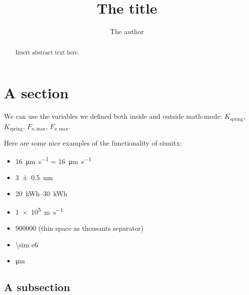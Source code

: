 \documentclass[11pt,a4paper]{article}
\title{The title}
\author{The author}
\newcommand{\Kspring}{\ensuremath{K_\mathrm{spring}}\xspace}
\newcommand{\Fxmax}{\ensuremath{F_{x,\mathrm{max}}}\xspace}
\begin{document}
\maketitle

\begin{abstract}
Insert abstract text here.
\end{abstract}

\tableofcontents

\section{A section}
\label{sec: a section}

We can use the variables we defined both inside and outside math-mode: \Kspring, $\Kspring$, \Fxmax, $\Fxmax$.

Here are some nice examples of the functionality of siunitx:

\begin{itemize}
	\item \SI{16}{\um\per\second} = \SI{16}{\micro\meter\per\s}
	\item \SI{3+-0.5}{nm}
	\item \SIrange{20}{30}{\kWh}
	\item \SI{1e5}{\meter\per\second}
	\item \num{900000} (thin space as thousants separator)
	\item \num{\sim e6}
	\item \si{\um}
\end{itemize}


\subsection{A subsection}
\label{sec: a subsection}


\end{document}
